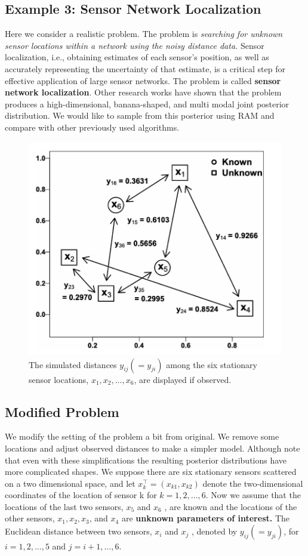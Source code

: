 \documentclass{article}
\begin{document}
\subsection{Example 3: Sensor Network Localization}
Here we consider a realistic problem. The problem is \textit{searching for unknown
sensor locations within a network using the noisy distance data.}
 Sensor localization, i.e., obtaining estimates of each sensor’s position, as
well as accurately representing the uncertainty of that estimate, is a critical step for effective application of large sensor networks. The problem is called \textbf{sensor network localization}. Other research works have shown that the problem produces a high-dimensional, banana-shaped, and multi modal joint posterior distribution. We would like to sample from this posterior using RAM and compare with other previously used algorithms.
\begin{figure}[ht]
    \centering
    \includegraphics[width=\textwidth]{exa-3-sensor-plot.png}
    \caption{ The simulated distances $y_{ij} (= y_{ji} )$ among the six stationary sensor locations, $x_1 , x_2 , \ldots, x_6$, are displayed if observed.}
    \label{fig:exa3.0}
\end{figure}
\subsection*{Modified Problem}
We modify the setting of the problem a bit from original. We remove some locations and adjust observed distances to make a simpler
model. Although note that even with these simplifications the resulting posterior distributions have more complicated shapes.
We suppose there are six stationary sensors scattered
on a two dimensional space, and let $x_k^\top = (x_{k1}, x_{k2} )$ denote the
two-dimensional coordinates of the location of sensor k for
$k = 1, 2,\ldots,6.$ Now we assume that the locations of the last two
sensors, $x_5$ and $x_6$ , are known and the locations of the other
sensors, $x_1 , x_2, x_3 $, and $x_4$ are \textbf{unknown parameters of interest.}
The Euclidean distance between two sensors, $x_i$ and $x_j$ , denoted
by $y_{ij} (= y_{ji} )$, for $i = 1, 2, \ldots , 5$ and
$j = i + 1, \ldots , 6$. 
\end{document}
